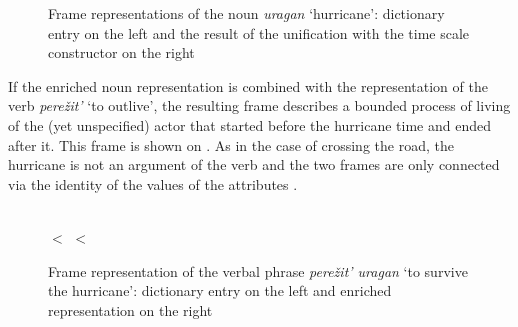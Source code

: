 \begin{figure}
\hfill%
\hfill%
\caption{Frame representations of the noun \textit{uragan} `hurricane': dictionary entry on the left and the result of the unification with the time scale constructor on the right \label{frame:hurricane}}
\end{figure}

If the enriched noun representation is combined with the representation of the verb \textit{pere\v{z}it'} `to outlive', the resulting frame describes a bounded process of living of the (yet unspecified) actor that started before the hurricane time and ended after it. This frame is shown on . As in the case of crossing the road, the hurricane is not an argument of the verb and the two frames are only connected via the identity of the values of the attributes \NOUNDIM.

\begin{figure}
\begin{minipage}{0.75\textwidth}
\end{minipage}\hfill%
\begin{minipage}{0.2\textwidth}\centering
{}\\
 $<$  $<$ \\
\end{minipage}
\caption{Frame representation of the verbal phrase \textit{pere\v{z}it' uragan} `to survive the hurricane': dictionary entry on the left and enriched representation on the right \label{frame:outlive:hurricane}}
\end{figure}

